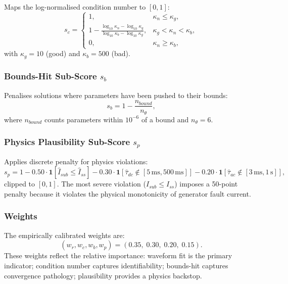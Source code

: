 \documentclass[12pt, a4paper]{article}
\theoremstyle{definition}
\theoremstyle{plain}
\begin{document}
Maps the log-normalised condition number to $[0, 1]$:
\begin{equation}
  s_c = \begin{cases}
    1, & \kappa_n \leq \kappa_g, \\
    \displaystyle 1 - \frac{\log_{10}\kappa_n - \log_{10}\kappa_g}
                           {\log_{10}\kappa_b - \log_{10}\kappa_g},
       & \kappa_g < \kappa_n < \kappa_b, \\
    0, & \kappa_n \geq \kappa_b,
  \end{cases}
  \label{eq:sc}
\end{equation}
with $\kappa_g = 10$ (good) and $\kappa_b = 500$ (bad).

\subsubsection{Bounds-Hit Sub-Score $s_b$}

Penalises solutions where parameters have been pushed to their bounds:
\begin{equation}
  s_b = 1 - \frac{n_{bound}}{n_\theta},
  \label{eq:sb}
\end{equation}
where $n_{bound}$ counts parameters within $10^{-6}$ of a bound and
$n_\theta = 6$.

\subsubsection{Physics Plausibility Sub-Score $s_p$}

Applies discrete penalty for physics violations:
\begin{equation}
  s_p = 1
    - 0.50\cdot\mathbf{1}[\hat{I}_{sub} \leq \hat{I}_{ss}]
    - 0.30\cdot\mathbf{1}[\hat{\tau}_{dc} \notin [5\,\text{ms}, 500\,\text{ms}]]
    - 0.20\cdot\mathbf{1}[\hat{\tau}_{ac} \notin [3\,\text{ms}, 1\,\text{s}]],
  \label{eq:sp}
\end{equation}
clipped to $[0, 1]$.  The most severe violation ($I_{sub} \leq I_{ss}$)
imposes a 50-point penalty because it violates the physical monotonicity
of generator fault current.

\subsubsection{Weights}

The empirically calibrated weights are:
\begin{equation}
  (w_r, w_c, w_b, w_p) = (0.35,\; 0.30,\; 0.20,\; 0.15).
  \label{eq:weights}
\end{equation}
These weights reflect the relative importance: waveform fit is the primary
indicator; condition number captures identifiability; bounds-hit captures
convergence pathology; plausibility provides a physics backstop.
\end{document}
